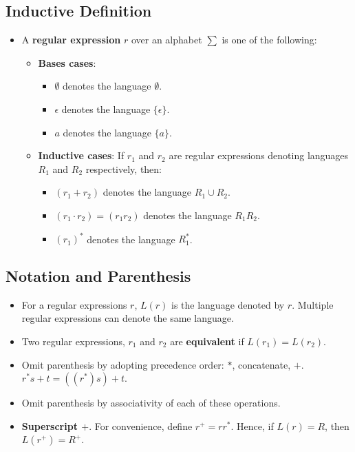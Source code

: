 \subsection{Inductive Definition}
\begin{itemize}
    \item A \textbf{regular expression} $r$ over an alphabet $\sum$ is one of the following:
    \begin{itemize}
        \item \textbf{Bases cases}:
        \begin{itemize}
            \item $\emptyset$ denotes the language $\emptyset$.
            \item $\epsilon$ denotes the language $\{\epsilon\}$.
            \item $a$ denotes the language $\{a\}$.
        \end{itemize}
        \item \textbf{Inductive cases}: If $r_1$ and $r_2$ are regular expressions denoting languages $R_1$ and $R_2$ respectively, then:
        \begin{itemize}
            \item $(r_1 + r_2)$ denotes the language $R_1 \cup R_2$.
            \item $(r_1 \cdot r_2) = (r_1r_2)$ denotes the language $R_1R_2$.
            \item $(r_1)^{\ast}$ denotes the language $R_1^{\ast}$.
        \end{itemize}
    \end{itemize}
\end{itemize}

\subsection{Notation and Parenthesis}
\begin{itemize}
    \item For a regular expressions $r$, $L(r)$ is the language denoted by $r$. Multiple regular expressions can denote the same language.
    \item Two regular expressions, $r_1$ and $r_2$ are \textbf{equivalent} if $L(r_1) = L(r_2)$.
    \item Omit parenthesis by adopting precedence order: $\ast$, concatenate, $+$. $r^{\ast} s + t = ((r^{\ast})s)+t$.
    \item Omit parenthesis by associativity of each of these operations.
    \item \textbf{Superscript $+$}. For convenience, define $r^+ = rr^{\ast}$. Hence, if $L(r) = R$, then $L(r^+) = R^+$.
\end{itemize}
